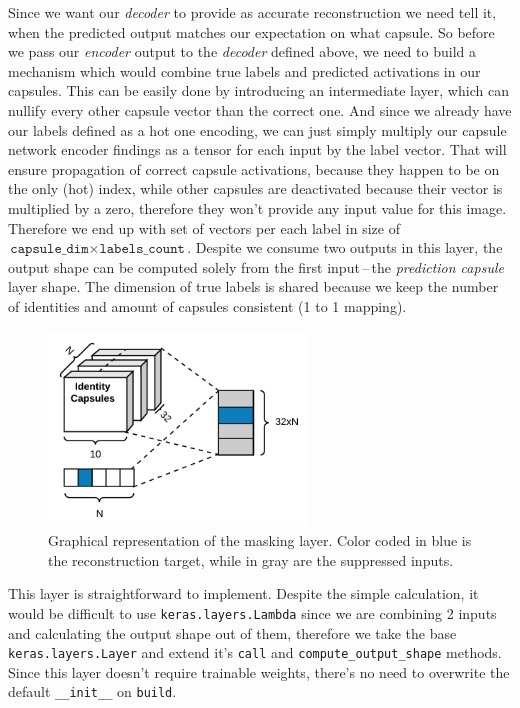 Since we want our \textit{decoder} to provide as accurate reconstruction we need tell it, when the predicted output matches our expectation on what capsule. So before we pass our \textit{encoder} output to the \textit{decoder} defined above, we need to build a mechanism which would combine true labels and predicted activations in our capsules. This can be easily done by introducing an intermediate layer, which can nullify every other capsule vector than the correct one. And since we already have our labels defined as a hot one encoding, we can just simply multiply our capsule network encoder findings as a tensor for each input by the label vector. That will ensure propagation of correct capsule activations, because they happen to be on the only (hot) index, while other capsules are deactivated because their vector is multiplied by a zero, therefore they won't provide any input value for this image. Therefore we end up with set of vectors per each label in size of $\texttt{capsule\_dim}\times\texttt{labels\_count}$. Despite we consume two outputs in this layer, the output shape can be computed solely from the first input\,--\,the \textit{prediction capsule} layer shape. The dimension of true labels is shared because we keep the number of identities and amount of capsules consistent (1 to 1 mapping).

\begin{figure}[ht]
    \centering
    \includegraphics[height=14em]{obrazky-figures/my_mask.pdf}
    \caption{Graphical representation of the masking layer. Color coded in blue is the reconstruction target, while in gray are the suppressed inputs.}
    \label{fig:mask}
\end{figure}

This layer is straightforward to implement. Despite the simple calculation, it would be difficult to use \texttt{keras.layers.Lambda} since we are combining 2 inputs and calculating the output shape out of them, therefore we take the base \texttt{keras.layers.Layer} and extend it's \texttt{call} and \texttt{compute\_output\_shape} methods. Since this layer doesn't require trainable weights, there's no need to overwrite the default \texttt{\_\_init\_\_} on \texttt{build}.

